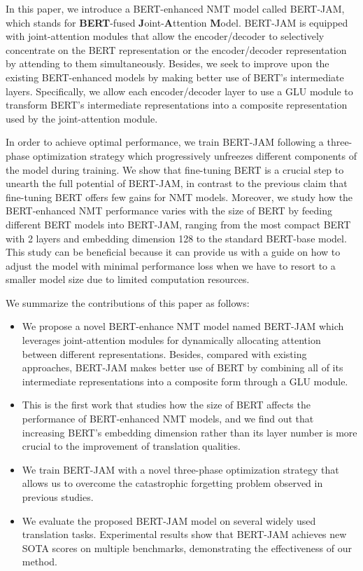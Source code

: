 \documentclass[review]{elsarticle}
\begin{document}
In this paper, we introduce a BERT-enhanced NMT model called BERT-JAM, which stands for \textbf{BERT}-fused \textbf{J}oint-\textbf{A}ttention \textbf{M}odel. BERT-JAM is equipped with joint-attention modules that allow the encoder/decoder to selectively concentrate on the BERT representation or the encoder/decoder representation by attending to them simultaneously. Besides, we seek to improve upon the existing BERT-enhanced models by making better use of BERT's intermediate layers. Specifically, we allow each encoder/decoder layer to use a GLU module to transform BERT's intermediate representations into a composite representation used by the joint-attention module.


In order to achieve optimal performance, we train BERT-JAM following a three-phase optimization strategy which progressively unfreezes different components of the model during training. 
We show that fine-tuning BERT is a crucial step to unearth the full potential of BERT-JAM, in contrast to the previous claim that fine-tuning BERT offers few gains \cite{Yang20} for NMT models. Moreover, we study how the BERT-enhanced NMT performance varies with the size of BERT by feeding different BERT models into BERT-JAM, ranging from the most compact BERT with 2 layers and embedding dimension 128 to the standard BERT-base model. This study can be beneficial because it can provide us with a guide on how to adjust the model with minimal performance loss when we have to resort to a smaller model size due to limited computation resources.



We summarize the contributions of this paper as follows: 
\begin{itemize}
   \item We propose a novel BERT-enhance NMT model named BERT-JAM which leverages joint-attention modules for dynamically allocating attention between different representations. Besides, compared with existing approaches, BERT-JAM makes better use of BERT by combining all of its intermediate representations into a composite form through a GLU module.
   \item This is the first work that studies how the size of BERT affects the performance of BERT-enhanced NMT models, and we find out that increasing BERT's embedding dimension rather than its layer number is more crucial to the improvement of translation qualities.
   \item We train BERT-JAM with a novel three-phase optimization strategy that allows us to overcome the catastrophic forgetting problem observed in previous studies.
   \item We evaluate the proposed BERT-JAM model on several widely used translation tasks. Experimental results show that BERT-JAM achieves new SOTA scores on multiple benchmarks, demonstrating the effectiveness of our method.
\end{itemize}
\end{document}
